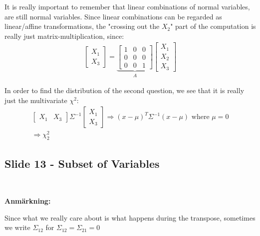 \par\bigskip
\noindent It is really important to remember that linear combinations of normal variables, are still normal variables. Since linear combinations can be regarded as linear/affine transformations, the "crossing out the $X_2$" part of the computation is really just matrix-multiplication, since:
\begin{equation*}
  \begin{gathered}
    \begin{bmatrix}X_1\\X_3\end{bmatrix} = \underbrace{\begin{bmatrix}1&0&0\\0&0&0\\0&0&1\end{bmatrix}}_{\text{$A$}}\begin{bmatrix}X_1\\X_2\\X_3\end{bmatrix}
  \end{gathered}
\end{equation*}
\par\bigskip
\noindent In order to find the distribution of the second question, we see that it is really just the multivariate $\chi^2$:
\begin{equation*}
  \begin{gathered}
    \begin{bmatrix}X_1&X_3\end{bmatrix}\Sigma^{-1}\begin{bmatrix}X_1\\X_3\end{bmatrix}\Rightarrow(x-\mu)^T\Sigma^{-1}(x-\mu)\text{ where } \mu = 0\\
    \Rightarrow \chi_2^2
  \end{gathered}
\end{equation*}
\par\bigskip
\subsection{Slide 13 - Subset of Variables}\hfill\\
\par\bigskip
\noindent\textbf{Anmärkning:}\par
\noindent Since what we really care about is what happens during the transpose, sometimes we write $\Sigma_{12}$ for $\Sigma_{12} = \Sigma_{21} = 0$ 
\par\bigskip
